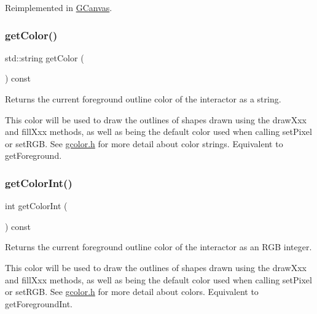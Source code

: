 Reimplemented in \mbox{\hyperlink{classsgl_1_1GCanvas_acd4f2b3b9619dacdfd71fc0004cac382}{G\+Canvas}}.

\mbox{\label{classsgl_1_1GDrawingSurface_aa061dfa488c31e18549d64363c1d0e34}} 
\subsubsection{\texorpdfstring{get\+Color()}{getColor()}}
{\footnotesize\ttfamily std\+::string get\+Color (\begin{DoxyParamCaption}{ }\end{DoxyParamCaption}) const\hspace{0.3cm}{\ttfamily [virtual]}}



Returns the current foreground outline color of the interactor as a string. 

This color will be used to draw the outlines of shapes drawn using the draw\+Xxx and fill\+Xxx methods, as well as being the default color used when calling set\+Pixel or set\+R\+GB. See \mbox{\hyperlink{gcolor_8h_source}{gcolor.\+h}} for more detail about color strings. Equivalent to get\+Foreground. \mbox{\label{classsgl_1_1GDrawingSurface_a9635c7af766cdc3417f346683fa0e6c1}} 
\subsubsection{\texorpdfstring{get\+Color\+Int()}{getColorInt()}}
{\footnotesize\ttfamily int get\+Color\+Int (\begin{DoxyParamCaption}{ }\end{DoxyParamCaption}) const\hspace{0.3cm}{\ttfamily [virtual]}}



Returns the current foreground outline color of the interactor as an R\+GB integer. 

This color will be used to draw the outlines of shapes drawn using the draw\+Xxx and fill\+Xxx methods, as well as being the default color used when calling set\+Pixel or set\+R\+GB. See \mbox{\hyperlink{gcolor_8h_source}{gcolor.\+h}} for more detail about colors. Equivalent to get\+Foreground\+Int. \mbox{\label{classsgl_1_1GDrawingSurface_a76f6964a11fde7c78e9751be184e1a3c}} 
